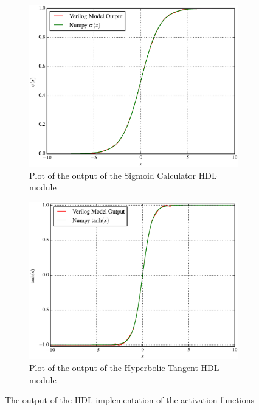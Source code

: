 \begin{figure}[H]
    \centering
    \begin{subfigure}{0.85\linewidth}
        \centering
        \includegraphics[width=\linewidth]{figures/nonlin-out.eps}
        \caption[Plot of the output of the Sigmoid Calculator HDL module]{Plot of the output of the Sigmoid Calculator HDL module}
        \label{fig:nonlin-out-sig}
    \end{subfigure}
    \begin{subfigure}{0.85\linewidth}
        \centering
        \includegraphics[width=\linewidth]{figures/nonlin-out-tanh.eps}
        \caption[Plot of the output of the Hyperbolic Tangent HDL module]{Plot of the output of the Hyperbolic Tangent HDL module}
        \label{fig:nonlin-out-tanh}
    \end{subfigure}
    \caption[The output of the HDL implementation of the activation functions]{The output of the HDL implementation of the activation functions}
    \label{fig:nonlin-out}
\end{figure}

